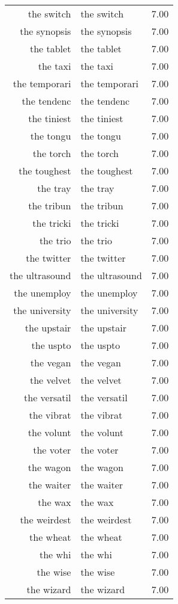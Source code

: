 \begin{table}[ht]
\begin{tabular}{rlr}
  the switch & the switch & 7.00 \\ 
  the synopsis & the synopsis & 7.00 \\ 
  the tablet & the tablet & 7.00 \\ 
  the taxi & the taxi & 7.00 \\ 
  the temporari & the temporari & 7.00 \\ 
  the tendenc & the tendenc & 7.00 \\ 
  the tiniest & the tiniest & 7.00 \\ 
  the tongu & the tongu & 7.00 \\ 
  the torch & the torch & 7.00 \\ 
  the toughest & the toughest & 7.00 \\ 
  the tray & the tray & 7.00 \\ 
  the tribun & the tribun & 7.00 \\ 
  the tricki & the tricki & 7.00 \\ 
  the trio & the trio & 7.00 \\ 
  the twitter & the twitter & 7.00 \\ 
  the ultrasound & the ultrasound & 7.00 \\ 
  the unemploy & the unemploy & 7.00 \\ 
  the university & the university & 7.00 \\ 
  the upstair & the upstair & 7.00 \\ 
  the uspto & the uspto & 7.00 \\ 
  the vegan & the vegan & 7.00 \\ 
  the velvet & the velvet & 7.00 \\ 
  the versatil & the versatil & 7.00 \\ 
  the vibrat & the vibrat & 7.00 \\ 
  the volunt & the volunt & 7.00 \\ 
  the voter & the voter & 7.00 \\ 
  the wagon & the wagon & 7.00 \\ 
  the waiter & the waiter & 7.00 \\ 
  the wax & the wax & 7.00 \\ 
  the weirdest & the weirdest & 7.00 \\ 
  the wheat & the wheat & 7.00 \\ 
  the whi & the whi & 7.00 \\ 
  the wise & the wise & 7.00 \\ 
  the wizard & the wizard & 7.00 \\ 

\end{tabular}
\end{table}
